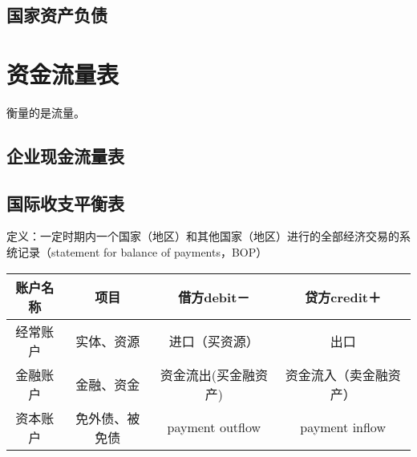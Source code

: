 \documentclass[12pt]{book}
\begin{document}
\section{国家资产负债}












\chapter{资金流量表}

衡量的是流量。




\section{企业现金流量表}



\section{国际收支平衡表}


定义：一定时期内一个国家（地区）和其他国家（地区）进行的全部经济交易的系统记录（statement for balance of payments，BOP）


\begin{tabu}{|c|c|c|c|}
    \hline
    账户名称 & 项目           & 借方debit－          & 贷方credit＋           \\\hline
    经常账户 & 实体、资源     & 进口（买资源）       & 出口                   \\\hline
    金融账户 & 金融、资金     & 资金流出(买金融资产) & 资金流入（卖金融资产） \\\hline
    资本账户 & 免外债、被免债 & payment outflow      & payment inflow         \\\hline
\end{tabu}
\end{document}

